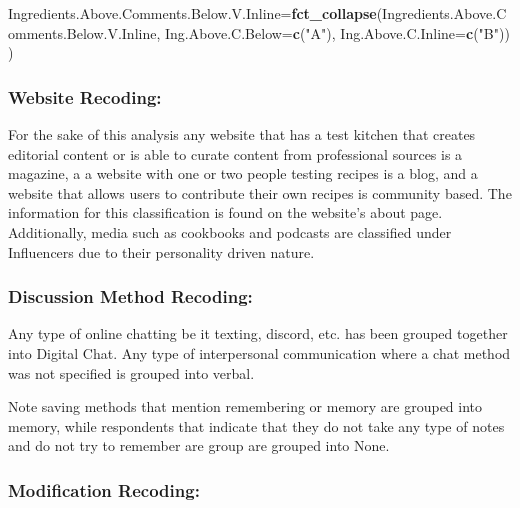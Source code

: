 \documentclass[
]{article}
\newenvironment{Shaded}{\begin{snugshade}}{\end{snugshade}}
\newcommand{\DataTypeTok}[1]{\textcolor[rgb]{0.13,0.29,0.53}{#1}}
\newcommand{\KeywordTok}[1]{\textcolor[rgb]{0.13,0.29,0.53}{\textbf{#1}}}
\newcommand{\NormalTok}[1]{#1}
\newcommand{\StringTok}[1]{\textcolor[rgb]{0.31,0.60,0.02}{#1}}
\begin{document}
\begin{Shaded}
\begin{Highlighting}[]
                  \DataTypeTok{Ingredients.Above.Comments.Below.V.Inline=}\KeywordTok{fct_collapse}\NormalTok{(Ingredients.Above.Comments.Below.V.Inline,}
                                                                         \DataTypeTok{Ing.Above.C.Below=}\KeywordTok{c}\NormalTok{(}\StringTok{"A"}\NormalTok{),}
                                                                         \DataTypeTok{Ing.Above.C.Inline=}\KeywordTok{c}\NormalTok{(}\StringTok{"B"}\NormalTok{))}
\NormalTok{                  )}
\end{Highlighting}
\end{Shaded}

\hypertarget{website-recoding}{%
\subsubsection{Website Recoding:}\label{website-recoding}}

For the sake of this analysis any website that has a test kitchen that
creates editorial content or is able to curate content from professional
sources is a magazine, a a website with one or two people testing
recipes is a blog, and a website that allows users to contribute their
own recipes is community based. The information for this classification
is found on the website's about page. Additionally, media such as
cookbooks and podcasts are classified under Influencers due to their
personality driven nature.

\hypertarget{discussion-method-recoding}{%
\subsubsection{Discussion Method
Recoding:}\label{discussion-method-recoding}}

Any type of online chatting be it texting, discord, etc. has been
grouped together into Digital Chat. Any type of interpersonal
communication where a chat method was not specified is grouped into
verbal.

Note saving methods that mention remembering or memory are grouped into
memory, while respondents that indicate that they do not take any type
of notes and do not try to remember are group are grouped into None.

\hypertarget{modification-recoding}{%
\subsubsection{Modification Recoding:}\label{modification-recoding}}
\end{document}
